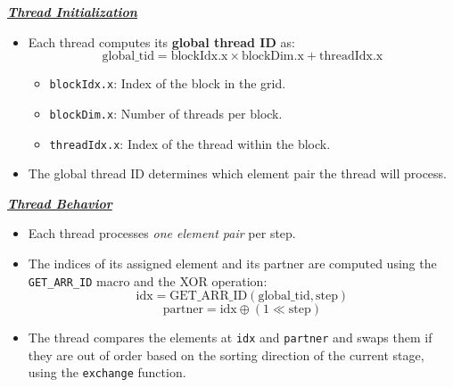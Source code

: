 \documentclass[12pt]{article}
\begin{document}
\vspace{+5pt}

\textbf{\underline{\textit{Thread Initialization}}}
\begin{itemize}[nosep]
    \item Each thread computes its \textbf{global thread ID} as:
    \[
    \text{global\_tid} = \text{blockIdx.x} \times \text{blockDim.x} + \text{threadIdx.x}
    \]
    \begin{itemize}[nosep]
        \item \texttt{blockIdx.x}: Index of the block in the grid.
        \item \texttt{blockDim.x}: Number of threads per block.
        \item \texttt{threadIdx.x}: Index of the thread within the block.
    \end{itemize}
    \item The global thread ID determines which element pair the thread will process.
\end{itemize}

\vspace{+5pt}

\textbf{\underline{\textit{Thread Behavior}}}
\begin{itemize}[nosep]
    \item Each thread processes \textit{one element pair} per step.
    \item The indices of its assigned element and its partner are computed using the \texttt{GET\_ARR\_ID} macro and the XOR operation:
    \[
    \text{idx} = \text{GET\_ARR\_ID}(\text{global\_tid}, \text{step})
    \]
    \[
    \text{partner} = \text{idx} \oplus (1 \ll \text{step})
    \]
    \item The thread compares the elements at \texttt{idx} and \texttt{partner} and swaps them if they are out of order based on the sorting direction of the current stage, using the \texttt{exchange} function.
\end{itemize}
\end{document}
